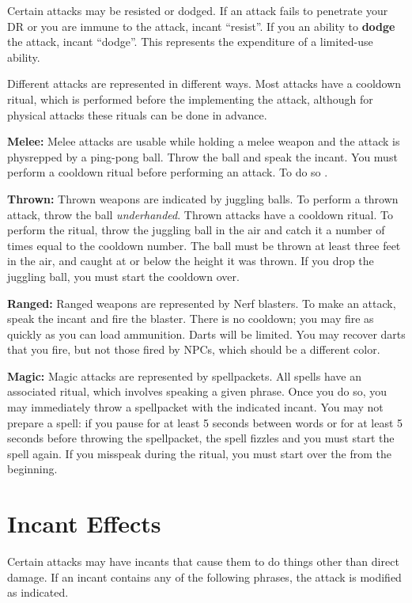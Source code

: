 \documentclass[green]{grimrock}
\begin{document}
Certain attacks may be resisted or dodged.  If an attack fails to penetrate your DR or you are immune to the attack, incant ``resist''.  If you an ability to {\bf dodge} the attack, incant ``dodge''.  This represents the expenditure of a limited-use ability.


Different attacks are represented in different ways.  Most attacks have a cooldown ritual, which is performed before the implementing the attack, although for physical attacks these rituals can be done in advance.

{\bf Melee:} Melee attacks are usable while holding a melee weapon and the attack is physrepped by a ping-pong ball.  Throw the ball and speak the incant.  You must perform a cooldown ritual before performing an attack.  To do so .

{\bf Thrown:}  Thrown weapons are indicated by juggling balls.  To perform a thrown attack, throw the ball \emph{underhanded}.  Thrown attacks have a cooldown ritual.  To perform the ritual, throw the juggling ball in the air and catch it a number of times equal to the cooldown number.  The ball must be thrown at least three feet in the air, and caught at or below the height it was thrown.  If you drop the juggling ball, you must start the cooldown over.

{\bf Ranged:} Ranged weapons are represented by Nerf blasters.  To make an attack, speak the incant and fire the blaster.  There is no cooldown; you may fire as quickly as you can load ammunition.  Darts will be limited.  You may recover darts that you fire, but not those fired by NPCs, which should be a different color.

{\bf Magic:}  Magic attacks are represented by spellpackets.  All spells have an associated ritual, which involves speaking a given phrase.  Once you do so, you may immediately throw a spellpacket with the indicated incant.  You may not prepare a spell: if you pause for at least 5 seconds between words or for at least 5 seconds before throwing the spellpacket, the spell fizzles and you must start the spell again.  If you misspeak during the ritual, you must start over the from the beginning.

\section{Incant Effects}

Certain attacks may have incants that cause them to do things other than direct damage.  If an incant contains any of the following phrases, the attack is modified as indicated.
\end{document}
